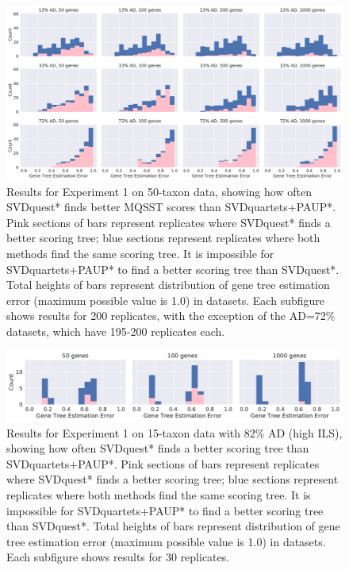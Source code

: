 \begin{figure}
  \centering
	  \includegraphics[width=\textwidth]{svdquest-figs/svdquestplus_vs_paup_better_score.pdf}
  \caption[Comparison of SVDquest* and SVDquartets+PAUP* with respect to MQSST scores on 50-taxon simulated data]{Results for Experiment 1 on 50-taxon data, showing how
    often SVDquest* finds better MQSST scores than SVDquartets+PAUP*. Pink
    sections of bars represent replicates where SVDquest* finds a
    better scoring tree; blue sections represent replicates where both
    methods find the same scoring tree. It is impossible for SVDquartets+PAUP* to
    find a better scoring tree than SVDquest*. Total heights of bars
    represent distribution of  gene tree estimation error (maximum possible value is 1.0) in
    datasets. {Each subfigure shows results for 200 replicates, with the exception of the AD=72\% datasets, which have 195-200 replicates each}.}\label{svdquest::fig:exp1_50}

\end{figure}


\begin{figure}
  \centering
  \includegraphics[width=\textwidth]{svdquest-figs/svdquestplus_vs_paup_better_score_15tax.pdf}
  \caption[Comparison of SVDquest* and SVDquartets+PAUP* with respect to MQSST scores on 15-taxon high ILS simulated data]{Results for Experiment 1 on 15-taxon data with 82\% AD
   (high ILS),
    showing how often SVDquest* finds a better scoring tree than
    SVDquartets+PAUP*. Pink sections of bars represent replicates where SVDquest*
    finds a better scoring tree; blue sections represent replicates
    where both methods find the same scoring tree. It is impossible for SVDquartets+PAUP* to
    find a better scoring tree than SVDquest*.  Total heights of
    bars represent distribution of gene tree estimation error (maximum possible value is 1.0) in
    datasets. Each subfigure shows results for 30 replicates.
    }\label{svdquest::fig:exp1_15}
\end{figure}

